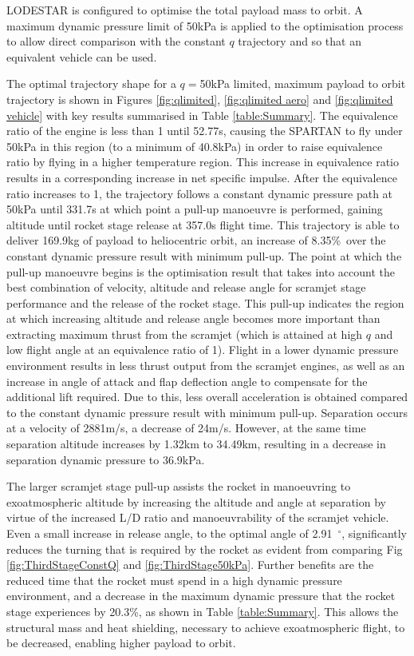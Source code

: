 \documentclass[journal]{new-aiaa}
\newcommand{\PayloadImprovement}{8.35\%}
\newcommand{\qDecrease}{20.3\%}
\newcommand{\PayloadToOrbitFiftykPa}{169.9}
\newcommand{\SeparationAltFiftykPa}{34.49}
\newcommand{\SeparationvFiftykPa}{2881}
\newcommand{\SeparationAngleFiftykPa}{2.91}
\newcommand{\SeparationqFiftykPa}{36.9}
\newcommand{\FlightTimeFiftykPa}{357.0}
\begin{document}
LODESTAR is configured to optimise the total payload mass to orbit.
A maximum dynamic pressure limit of 50kPa is applied to the optimisation process to allow direct comparison with the constant $q$ trajectory and so that an equivalent vehicle can be used.   

 
The optimal trajectory shape for a $q=$50kPa limited, maximum payload to orbit trajectory is shown in Figures \ref{fig:qlimited}, \ref{fig:qlimited aero} and \ref{fig:qlimited vehicle} with key results summarised in Table \ref{table:Summary}. 
The equivalence ratio of the engine is less than 1 until 52.77s, causing the SPARTAN to fly under 50kPa in this region (to a minimum of 40.8kPa) in order to raise equivalence ratio by flying in a higher temperature region. This increase in equivalence ratio results in a corresponding increase in net specific impulse.
 After the equivalence ratio increases to 1, the trajectory follows a constant dynamic pressure path at 50kPa until 331.7s at which point a pull-up manoeuvre is performed, gaining altitude until rocket stage release at \FlightTimeFiftykPa s flight time. 
 This trajectory is able to deliver \PayloadToOrbitFiftykPa kg of payload to heliocentric orbit, an increase of \PayloadImprovement\ over the constant dynamic pressure result with minimum pull-up. The point at which the pull-up manoeuvre begins is the optimisation result that takes into account the best combination of velocity, altitude and release angle for scramjet stage performance and the release of the rocket stage. This pull-up indicates the region at which increasing altitude and release angle becomes more important than extracting maximum thrust from the scramjet (which is attained at high $q$ and low flight angle at an equivalence ratio of 1).
 Flight in a lower dynamic pressure environment results in less thrust output from the scramjet engines, as well as an increase in angle of attack and flap deflection angle to compensate for the additional lift required. Due to this, less overall acceleration is obtained compared to the constant dynamic pressure result with minimum pull-up. Separation occurs at a velocity of \SeparationvFiftykPa m/s, a decrease of 24m/s. However, at the same time separation altitude increases by 1.32km to \SeparationAltFiftykPa km, resulting in a decrease in separation dynamic pressure to \SeparationqFiftykPa kPa. 

The larger scramjet stage pull-up assists the rocket in manoeuvring to exoatmospheric altitude by increasing the altitude and angle at separation by virtue of the increased L/D ratio and manoeuvrability of the scramjet vehicle. Even a small increase in release angle, to the optimal angle of \SeparationAngleFiftykPa~$^\circ$, significantly reduces the turning that is required by the rocket as evident from comparing Fig \ref{fig:ThirdStageConstQ} and \ref{fig:ThirdStage50kPa}. Further benefits are the reduced time that the rocket must spend in a high dynamic pressure environment, and a decrease in the maximum dynamic pressure that the rocket stage experiences by \qDecrease, as shown in Table \ref{table:Summary}. This allows the structural mass and heat shielding, necessary to achieve exoatmospheric flight, to be decreased, enabling higher payload to orbit. 
\end{document}
